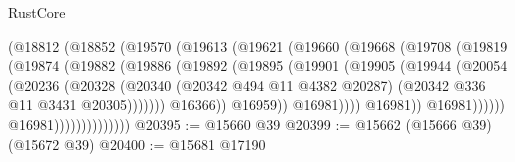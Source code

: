 \begin{lexlean}{RustCore}
\begin{coremodule}
                                  (@18812
                                    (@18852
                                      (@19570
                                        (@19613
                                          (@19621
                                            (@19660
                                              (@19668
                                                (@19708
                                                  (@19819
                                                    (@19874
                                                      (@19882
                                                        (@19886
                                                          (@19892
                                                            (@19895
                                                              (@19901
                                                                (@19905
                                                                  (@19944
                                                                    (@20054
                                                                      (@20236
                                                                        (@20328
                                                                          (@20340
                                                                            (@20342
                                                                              @494
                                                                              @11
                                                                              @4382
                                                                              @20287)
                                                                            (@20342
                                                                              @336
                                                                              @11
                                                                              @3431
                                                                              @20305)))))))
                                                                @16366))
                                                            @16959))
                                                        @16981))))
                                                @16981))
                                            @16981))))))
                                @16981))))))))))))))
@20395 := @15660 @39
@20399 := @15662 (@15666 @39) (@15672 @39)
@20400 := @15681 @17190

\end{coremodule}
\end{lexlean}
